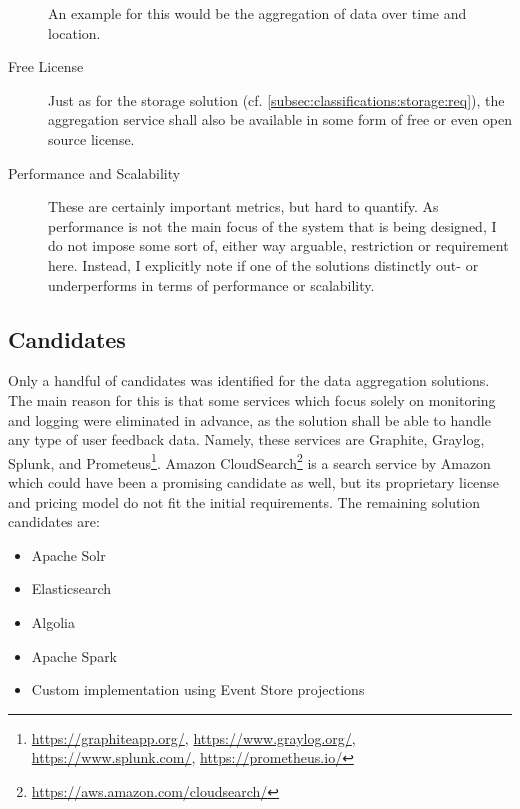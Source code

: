 \begin{description}
An example for this would be the aggregation of data over time and location.
\item [Free License]
Just as for the storage solution (cf. \cref{subsec:classifications:storage:req}), the aggregation service shall also be available in some form of free or even open source license.
\item [Performance and Scalability]
These are certainly important metrics, but hard to quantify.
As performance is not the main focus of the system that is being designed, I do not impose some sort of, either way arguable, restriction or requirement here.
Instead, I explicitly note if one of the solutions distinctly out- or underperforms in terms of performance or scalability.
\end{description}

\subsection{Candidates}

Only a handful of candidates was identified for the data aggregation solutions.
The main reason for this is that some services which focus solely on monitoring and logging were eliminated in advance, as the solution shall be able to handle any type of user feedback data.
Namely, these services are Graphite, Graylog, Splunk, and Prometeus\footnote{\url{https://graphiteapp.org/}, \url{https://www.graylog.org/}, \url{https://www.splunk.com/}, \url{https://prometheus.io/}}.
Amazon CloudSearch\footnote{\url{https://aws.amazon.com/cloudsearch/}} is a search service by Amazon which could have been a promising candidate as well, but its proprietary license and pricing model do not fit the initial requirements.
The remaining solution candidates are:

\begin{itemize}[noitemsep]
\item Apache Solr
\item Elasticsearch
\item Algolia
\item Apache Spark
\item Custom implementation using Event Store projections
\end{itemize}


